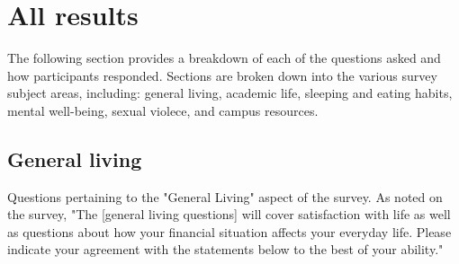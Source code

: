 \documentclass{article}\usepackage[]{graphicx}\usepackage[]{color}
\begin{document}
\newpage
\section{All results}
The following section provides a breakdown of each of the questions asked and how participants responded. Sections are broken down into the various survey subject areas, including: general living, academic life, sleeping and eating habits, mental well-being, sexual violece, and campus resources.



\subsection{General living}
Questions pertaining to the "General Living" aspect of the survey. As noted on the survey, "The  [general living questions] will cover satisfaction with life as well as questions about how your financial situation affects your everyday life.  Please indicate your agreement with the statements below to the best of your ability."
\end{document}
